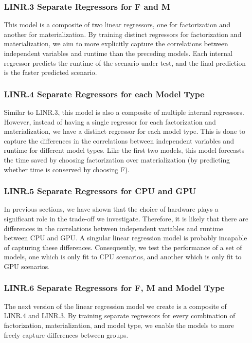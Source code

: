 \subsubsection*{LINR.3 Separate Regressors for F and M}
This model is a composite of two linear regressors, one for factorization and another for materialization. By training distinct regressors for factorization and materialization, we aim to more explicitly capture the correlations between independent variables and runtime than the preceding models. Each internal regressor predicts the runtime of the scenario under test, and the final prediction is the faster predicted scenario.

\subsubsection*{LINR.4 Separate Regressors for each Model Type}
Similar to LINR.3, this model is also a composite of multiple internal regressors. However, instead of having a single regressor for each factorization and materialization, we have a distinct regressor for each model type. This is done to capture the differences in the correlations between independent variables and runtime for different model types. Like the first two models, this model forecasts the time saved by choosing factorization over materialization (by predicting whether time is conserved by choosing F).

\subsubsection*{LINR.5 Separate Regressors for CPU and GPU}
In previous sections, we have shown that the choice of hardware plays a significant role in the trade-off we investigate. Therefore, it is likely that there are differences in the correlations between independent variables and runtime between CPU and GPU. A singular linear regression model is probably incapable of capturing these differences. Consequently, we test the performance of a set of models, one which is only fit to CPU scenarios, and another which is only fit to GPU scenarios.

\subsubsection*{LINR.6 Separate Regressors for F, M and Model Type}
The next version of the linear regression model we create is a composite of LINR.4 and LINR.3. By training separate regressors for every combination of factorization, materialization, and model type, we enable the models to more freely capture differences between groups.

